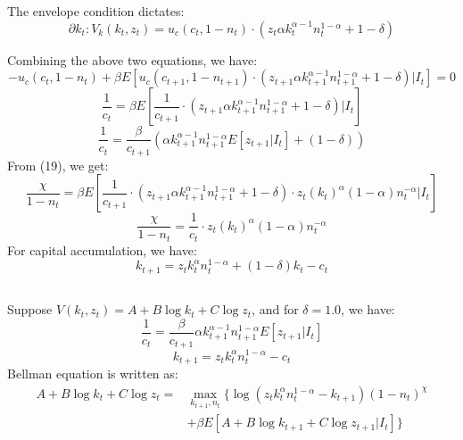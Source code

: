 \documentclass{article}
\begin{document}
The envelope condition dictates:
\begin{equation}
    \partial{k_t}: V_k(k_t, z_t) = u_c\left(c_t, 1 - n_t\right) \cdot \left(z_t \alpha k_t^{\alpha - 1} n_t^{1-\alpha} + 1 - \delta\right)
\end{equation}

Combining the above two equations, we have:
\begin{equation}
    -u_c\left(c_t, 1 - n_t\right) + \beta E[u_c\left(c_{t+1}, 1 - n_{t+1}\right) \cdot \left(z_{t+1} \alpha k_{t+1}^{\alpha - 1} n_{t+1}^{1-\alpha} + 1 - \delta\right) | I_t] = 0
\end{equation}
\begin{equation}
    \frac{1}{c_t} = \beta E\left[\frac{1}{c_{t+1}} \cdot \left(z_{t+1} \alpha k_{t+1}^{\alpha - 1} n_{t+1}^{1-\alpha} + 1 - \delta\right) | I_t\right]
\end{equation}
\begin{equation}
    \frac{1}{c_t} =  \frac{\beta}{c_{t+1}} \left( \alpha k_{t+1}^{\alpha - 1} n_{t+1}^{1-\alpha} E\left[z_{t+1} | I_t\right] + \left(1 - \delta\right) \right)
\end{equation}
From (19), we get:
\begin{equation}
    \frac{\chi}{1-n_t} = \beta E\left[\frac{1}{c_{t+1}} \cdot \left(z_{t+1} \alpha k_{t+1}^{\alpha - 1} n_{t+1}^{1-\alpha} + 1 - \delta\right)  \cdot z_t (k_t)^{\alpha}(1-\alpha)n_t^{-\alpha} | I_t\right]
\end{equation}
\begin{equation}
    \frac{\chi}{1-n_t} = \frac{1}{c_t} \cdot z_t (k_t)^{\alpha}(1-\alpha)n_t^{-\alpha}
\end{equation}
For capital accumulation, we have:
\begin{equation}
    k_{t+1} = z_t k_t^\alpha n_t^{1-\alpha} + (1-\delta) k_t - c_t
\end{equation}

\subsection{}

Suppose \(V(k_t, z_t) = A + B \log k_t + C \log z_t\), and for \(\delta = 1.0\), we have:
\[\frac{1}{c_t} =  \frac{\beta}{c_{t+1}} \alpha k_{t+1}^{\alpha - 1} n_{t+1}^{1-\alpha} E\left[z_{t+1} | I_t\right] \]
\[k_{t+1} = z_t k_t^\alpha n_t^{1-\alpha} - c_t\]
Bellman equation is written as:\\
\begin{align*}
    A +  B \log k_t + C \log z_t = & \max_{k_{t+1}, n_t} \{ \log\left(z_t k_t^\alpha n_t^{1-\alpha} - k_{t+1}\right)\left( 1 - n_t\right)^\chi \\
    & + \beta E[A + B \log k_{t+1} + C \log z_{t+1} | I_t] \}
\end{align*}
\end{document}
